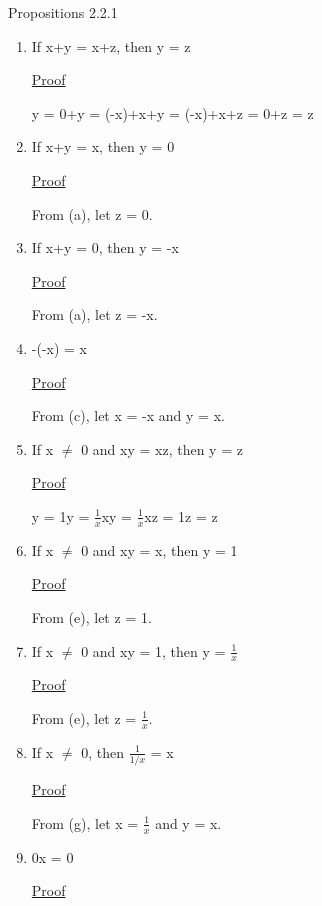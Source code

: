 { \color{blue} Propositions 2.2.1 }
	\begin{enumerate}[label=(\alph*), leftmargin=2cm, itemsep=0.4em]
		\item If x+y = x+z, then y = z

			{ \color{magenta} \underline{Proof}  }
		
				y = 0+y = (-x)+x+y = (-x)+x+z = 0+z = z
			
		\newpage
	
		\item If x+y = x, then y = 0

			{ \color{magenta} \underline{Proof} }

				From (a), let z = 0.
	
		\item If x+y = 0, then y = -x
	
			{ \color{magenta} \underline{Proof} }

				From (a), let z = -x.
	
		\item -(-x) = x

			{ \color{magenta} \underline{Proof} }

				From (c), let x = -x and y = x.
	
		\item If x $\not =$ 0 and xy = xz, then y = z

			{ \color{magenta} \underline{Proof} } 
		
				y = 1y = $\frac{1}{x}$xy = $\frac{1}{x}$xz = 1z = z 
	
		\item If x $\not =$ 0 and xy = x, then y = 1

			{ \color{magenta} \underline{Proof} } 
		
				From (e), let z = 1.
	
		\item If x $\not =$ 0 and xy = 1, then y = $\frac{1}{x}$

			{ \color{magenta} \underline{Proof} } 
		
				From (e), let z = $\frac{1}{x}$.
	
		\item If x $\not =$ 0, then $\frac{1}{1/x}$ = x

			{ \color{magenta} \underline{Proof} } 
		
				From (g), let x = $\frac{1}{x}$ and y = x.
	
		\item 0x = 0

			{ \color{magenta} \underline{Proof} } 
		

\end{enumerate}
